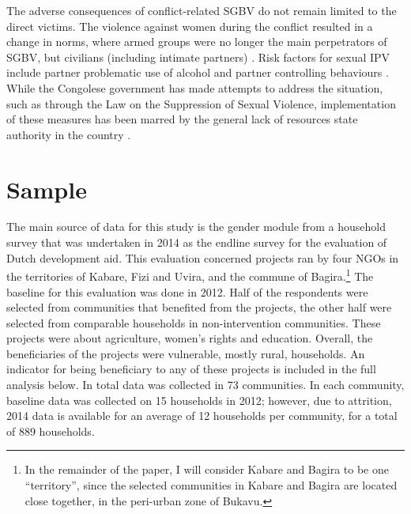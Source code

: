 The adverse consequences of conflict-related SGBV do not remain limited to the direct victims. The violence against women during the conflict resulted in a change in norms, where armed groups were no longer the main perpetrators of SGBV, but civilians (including intimate partners) \citep{Freedman2011}. Risk factors for sexual IPV include partner problematic use of alcohol and partner controlling behaviours \citep{Babalola2014}. While the Congolese government has made attempts to address the situation, such as through the Law on the Suppression of Sexual Violence, implementation of these measures has been marred by the general lack of resources state authority in the country \citep{Steiner2009}.

\section{Sample}

The main source of data for this study is the gender module from a household survey that was undertaken in 2014 as the endline survey for the evaluation of Dutch development aid. This evaluation concerned projects ran by four NGOs in the territories of Kabare, Fizi and Uvira, and the commune of Bagira.\footnote{In the remainder of the paper, I will consider Kabare and Bagira to be one ``territory'', since the selected communities in Kabare and Bagira are located close together, in the peri-urban zone of Bukavu.} The baseline for this evaluation was done in 2012. Half of the respondents were selected from communities that benefited from the projects, the other half were selected from comparable households in non-intervention communities. These projects were about agriculture, women's rights and education. Overall, the beneficiaries of the projects were vulnerable, mostly rural, households. An indicator for being beneficiary to any of these projects is included in the full analysis below. In total data was collected in 73 communities. In each community, baseline data was collected on 15 households in 2012; however, due to attrition, 2014 data is available for an average of 12 households per community, for a total of 889 households. 

